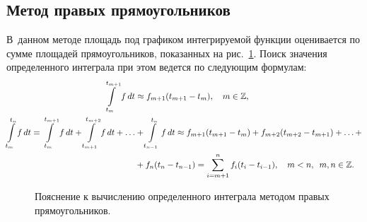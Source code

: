 \documentclass[12pt,a4paper,openany]{extarticle}
\begin{document}
\subsection{Метод правых прямоугольников}
\hspace*{\parindent}В~данном методе площадь под графиком интегрируемой функции оценивается по сумме площадей прямоугольников, показанных на рис.~\ref{fig:right_rect_method}.
Поиск значения определенного интеграла при этом ведется по следующим формулам:
\begin{align}
\int\limits_{t_m}^{t_{m+1}} f\,dt &\approx f_{m+1}(t_{m+1}-t_m), \quad m\in\mathbb{Z},\\
\int\limits_{t_m}^{t_{n}} f\,dt = \int\limits_{t_m}^{t_{m+1}} f\,dt + \int\limits_{t_{m+1}}^{t_{m+2}} f\,dt + \ldots &+ \int\limits_{t_{n-1}}^{t_{n}} f\,dt \approx f_{m+1}(t_{m+1}-t_m) + f_{m+2}(t_{m+2}-t_{m+1}) + \ldots + \notag\\
&+ f_{n}(t_{n}-t_{n-1}) = \sum\limits_{i=m+1}^{n}f_i(t_i-t_{i-1}), \quad m<n, \;\: m,n\in\mathbb{Z}\ldotp
\end{align}

\begin{figure}[p]
	\caption{Пояснение к вычислению определенного интеграла методом правых прямоугольников.}
	\label{fig:right_rect_method}
\end{figure}
\end{document}
